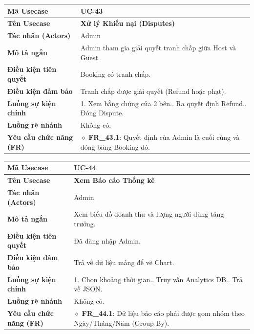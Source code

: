 \begin{table}[H]
\renewcommand{\arraystretch}{1.3}
\centering
\begin{tabularx}{\textwidth}{|p{4.5cm}|X|}
\hline
\cellcolor{gray!15}\bfseries Mã Usecase & \textbf{UC-43} \\ \hline
\cellcolor{gray!15}\bfseries Tên Usecase & \textbf{Xử lý Khiếu nại (Disputes)} \\ \hline
\cellcolor{gray!15}\bfseries Tác nhân (Actors) & Admin \\ \hline
\cellcolor{gray!15}\bfseries Mô tả ngắn & Admin tham gia giải quyết tranh chấp giữa Host và Guest. \\ \hline
\cellcolor{gray!15}\bfseries Điều kiện tiên quyết & Booking có tranh chấp. \\ \hline
\cellcolor{gray!15}\bfseries Điều kiện đảm bảo & Tranh chấp được giải quyết (Refund hoặc phạt). \\ \hline
\cellcolor{gray!15}\bfseries Luồng sự kiện chính & 1. Xem bằng chứng của 2 bên.\newline 2. Ra quyết định Refund.\newline 3. Đóng Dispute. \\ \hline
\cellcolor{gray!15}\bfseries Luồng rẽ nhánh & Không có. \\ \hline
\cellcolor{gray!15}\bfseries Yêu cầu chức năng (FR) & $\diamond$ \textbf{FR\_43.1}: Quyết định của Admin là cuối cùng và đóng băng Booking đó. \\ \hline
\end{tabularx}
\end{table}

\begin{table}[H]
\renewcommand{\arraystretch}{1.3}
\centering
\begin{tabularx}{\textwidth}{|p{4.5cm}|X|}
\hline
\cellcolor{gray!15}\bfseries Mã Usecase & \textbf{UC-44} \\ \hline
\cellcolor{gray!15}\bfseries Tên Usecase & \textbf{Xem Báo cáo Thống kê} \\ \hline
\cellcolor{gray!15}\bfseries Tác nhân (Actors) & Admin \\ \hline
\cellcolor{gray!15}\bfseries Mô tả ngắn & Xem biểu đồ doanh thu và lượng người dùng tăng trưởng. \\ \hline
\cellcolor{gray!15}\bfseries Điều kiện tiên quyết & Đã đăng nhập Admin. \\ \hline
\cellcolor{gray!15}\bfseries Điều kiện đảm bảo & Trả về dữ liệu mảng để vẽ Chart. \\ \hline
\cellcolor{gray!15}\bfseries Luồng sự kiện chính & 1. Chọn khoảng thời gian.\newline 2. Truy vấn Analytics DB.\newline 3. Trả về JSON. \\ \hline
\cellcolor{gray!15}\bfseries Luồng rẽ nhánh & Không có. \\ \hline
\cellcolor{gray!15}\bfseries Yêu cầu chức năng (FR) & $\diamond$ \textbf{FR\_44.1}: Dữ liệu báo cáo phải được gom nhóm theo Ngày/Tháng/Năm (Group By). \\ \hline
\end{tabularx}
\end{table}

